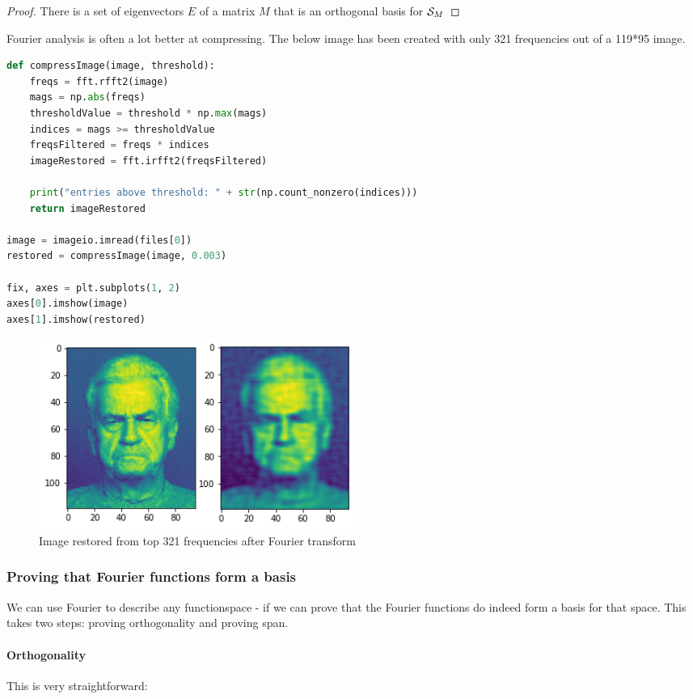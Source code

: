 \begin{proof}There is a set of eigenvectors $E$ of a matrix $M$ that is an orthogonal basis for $\mathcal{S}_{M}$
    \subprf{}{}{}
\end{proof}

Fourier analysis is often a lot better at compressing. The below image has been created with only 321 frequencies out of a 119*95 image.
\begin{lstlisting}[language=python]
def compressImage(image, threshold):
    freqs = fft.rfft2(image)
    mags = np.abs(freqs)
    thresholdValue = threshold * np.max(mags)
    indices = mags >= thresholdValue
    freqsFiltered = freqs * indices
    imageRestored = fft.irfft2(freqsFiltered)

    print("entries above threshold: " + str(np.count_nonzero(indices)))
    return imageRestored

image = imageio.imread(files[0])
restored = compressImage(image, 0.003)

fix, axes = plt.subplots(1, 2)
axes[0].imshow(image)
axes[1].imshow(restored)
\end{lstlisting}

\begin{figure}[h]
    \caption{Image restored from top 321 frequencies after Fourier transform}
    \centering
      \includegraphics[width=0.5\textwidth]{images/fourier_compression.png}
\end{figure}


\subsubsection{Proving that Fourier functions form a basis}

We can use Fourier to describe any functionspace - if we can prove that the Fourier functions do indeed form a basis for that space. This takes two steps: proving orthogonality and proving span.

\paragraph{Orthogonality} This is very straightforward: 

